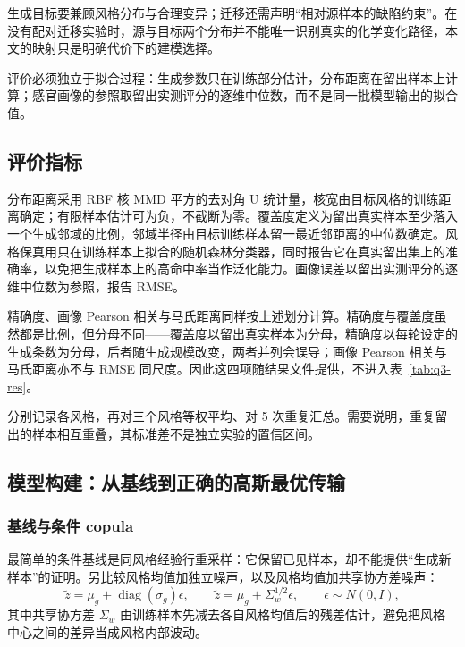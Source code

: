 \documentclass[UTF8,a4paper,zihao=-4]{ctexart}
\numberwithin{figure}{section}
\numberwithin{table}{section}
\numberwithin{equation}{section}
\begin{document}
生成目标要兼顾风格分布与合理变异；迁移还需声明“相对源样本的缺陷约束”。在没有配对迁移实验时，源与目标两个分布并不能唯一识别真实的化学变化路径，本文的映射只是明确代价下的建模选择。

评价必须独立于拟合过程：生成参数只在训练部分估计，分布距离在留出样本上计算；感官画像的参照取留出实测评分的逐维中位数，而不是同一批模型输出的拟合值。

\subsection{评价指标}

分布距离采用 RBF 核 MMD 平方的去对角 U 统计量，核宽由目标风格的训练距离确定；有限样本估计可为负，不截断为零。覆盖度定义为留出真实样本至少落入一个生成邻域的比例，邻域半径由目标训练样本留一最近邻距离的中位数确定。风格保真用只在训练样本上拟合的随机森林分类器，同时报告它在真实留出集上的准确率，以免把生成样本上的高命中率当作泛化能力。画像误差以留出实测评分的逐维中位数为参照，报告 RMSE。

精确度、画像 Pearson 相关与马氏距离同样按上述划分计算。精确度与覆盖度虽然都是比例，但分母不同——覆盖度以留出真实样本为分母，精确度以每轮设定的生成条数为分母，后者随生成规模改变，两者并列会误导；画像 Pearson 相关与马氏距离亦不与 RMSE 同尺度。因此这四项随结果文件提供，不进入表~\ref{tab:q3-res}。

分别记录各风格，再对三个风格等权平均、对 5 次重复汇总。需要说明，重复留出的样本相互重叠，其标准差不是独立实验的置信区间。

\subsection{模型构建：从基线到正确的高斯最优传输}

\subsubsection{基线与条件 copula}

最简单的条件基线是同风格经验行重采样：它保留已见样本，却不能提供“生成新样本”的证明。另比较风格均值加独立噪声，以及风格均值加共享协方差噪声：
\begin{equation}
\tilde z=\mu_g+\operatorname{diag}(\sigma_g)\epsilon,\qquad
\tilde z=\mu_g+\Sigma_w^{1/2}\epsilon,\qquad \epsilon\sim N(0,I),
\label{eq:noise-baseline}
\end{equation}
其中共享协方差 $\Sigma_w$ 由训练样本先减去各自风格均值后的残差估计，避免把风格中心之间的差异当成风格内部波动。
\end{document}
